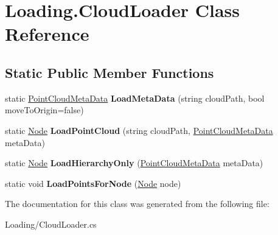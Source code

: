 \hypertarget{class_loading_1_1_cloud_loader}{}\section{Loading.\+Cloud\+Loader Class Reference}
\label{class_loading_1_1_cloud_loader}
\subsection*{Static Public Member Functions}
\begin{DoxyCompactItemize}
\item 
\mbox{\label{class_loading_1_1_cloud_loader_a234660c32f4fa182426e11b597149821}} 
static \hyperlink{class_cloud_data_1_1_point_cloud_meta_data}{Point\+Cloud\+Meta\+Data} {\bfseries Load\+Meta\+Data} (string cloud\+Path, bool move\+To\+Origin=false)
\item 
\mbox{\label{class_loading_1_1_cloud_loader_a4a3de7574dec7b35d70ff2a51c09353f}} 
static \hyperlink{class_cloud_data_1_1_node}{Node} {\bfseries Load\+Point\+Cloud} (string cloud\+Path, \hyperlink{class_cloud_data_1_1_point_cloud_meta_data}{Point\+Cloud\+Meta\+Data} meta\+Data)
\item 
\mbox{\label{class_loading_1_1_cloud_loader_a13e35349e28c5091565880d77bc3423a}} 
static \hyperlink{class_cloud_data_1_1_node}{Node} {\bfseries Load\+Hierarchy\+Only} (\hyperlink{class_cloud_data_1_1_point_cloud_meta_data}{Point\+Cloud\+Meta\+Data} meta\+Data)
\item 
\mbox{\label{class_loading_1_1_cloud_loader_a623c96ee2eee44b30b86fea2661fcbd8}} 
static void {\bfseries Load\+Points\+For\+Node} (\hyperlink{class_cloud_data_1_1_node}{Node} node)
\end{DoxyCompactItemize}


The documentation for this class was generated from the following file\+:\begin{DoxyCompactItemize}
\item 
Loading/Cloud\+Loader.\+cs\end{DoxyCompactItemize}
